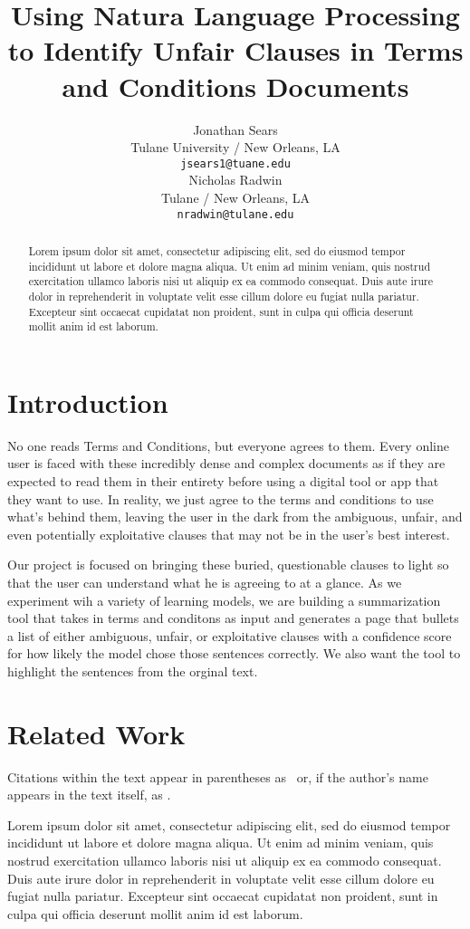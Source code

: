 \documentclass[11pt,a4paper]{article}
\title{Using Natura Language Processing to Identify Unfair Clauses in Terms and Conditions Documents}
\author{Jonathan Sears\\
  Tulane University / New Orleans, LA \\
  \texttt{jsears1@tuane.edu} \\\And
  Nicholas Radwin \\
  Tulane  / New Orleans, LA\\
  \texttt{nradwin@tulane.edu} \\}
\date{}
\begin{document}
\maketitle
\begin{abstract}
Lorem ipsum dolor sit amet, consectetur adipiscing elit, sed do eiusmod tempor incididunt ut labore et dolore magna aliqua. Ut enim ad minim veniam, quis nostrud exercitation ullamco laboris nisi ut aliquip ex ea commodo consequat. Duis aute irure dolor in reprehenderit in voluptate velit esse cillum dolore eu fugiat nulla pariatur. Excepteur sint occaecat cupidatat non proident, sunt in culpa qui officia deserunt mollit anim id est laborum.
\end{abstract}


\section{Introduction}

No one reads Terms and Conditions, but everyone agrees to them. Every online user is faced with these
incredibly dense and complex documents as if they are expected to read them in their entirety before
using a digital tool or app that they want to use. In reality, we just agree to the terms and conditions
to use what's behind them, leaving the user in the dark from the ambiguous, unfair, and even potentially
exploitative clauses that may not be in the user's best interest. 

Our project is focused on bringing these buried, questionable clauses to light so that the user can understand 
what he is agreeing to at a glance. As we experiment wih a variety of learning models, we are building a
summarization tool that takes in terms and conditons as input and generates a page that bullets a list of 
either ambiguous, unfair, or exploitative clauses with a confidence score for how likely the model chose 
those sentences correctly. We also want the tool to highlight the sentences from the orginal text.

\section{Related Work}

Citations within the text appear in parentheses as~\citep{aho1972theory} or, if the author's name appears in the text itself, as \citet{andrew2007scalable}.



Lorem ipsum dolor sit amet, consectetur adipiscing elit, sed do eiusmod tempor incididunt ut labore et dolore magna aliqua. Ut enim ad minim veniam, quis nostrud exercitation ullamco laboris nisi ut aliquip ex ea commodo consequat. Duis aute irure dolor in reprehenderit in voluptate velit esse cillum dolore eu fugiat nulla pariatur. Excepteur sint occaecat cupidatat non proident, sunt in culpa qui officia deserunt mollit anim id est laborum.
\end{document}
